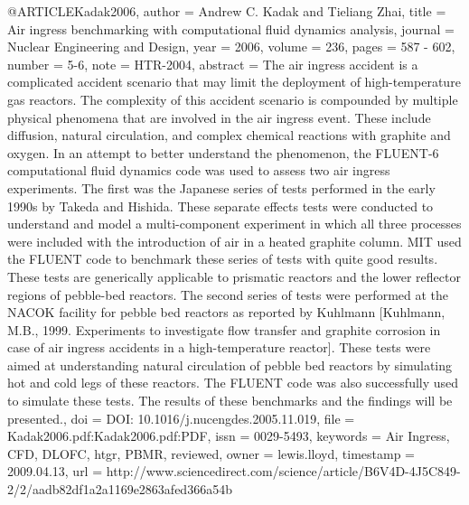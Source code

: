 {@ARTICLE{Kadak2006,
  author = {Andrew C. Kadak and Tieliang Zhai},
  title = {Air ingress benchmarking with computational fluid dynamics analysis},
  journal = {Nuclear Engineering and Design},
  year = {2006},
  volume = {236},
  pages = {587 - 602},
  number = {5-6},
  note = {HTR-2004},
  abstract = {The air ingress accident is a complicated accident scenario that may
	limit the deployment of high-temperature gas reactors. The complexity
	of this accident scenario is compounded by multiple physical phenomena
	that are involved in the air ingress event. These include diffusion,
	natural circulation, and complex chemical reactions with graphite
	and oxygen. In an attempt to better understand the phenomenon, the
	FLUENT-6 computational fluid dynamics code was used to assess two
	air ingress experiments. The first was the Japanese series of tests
	performed in the early 1990s by Takeda and Hishida. These separate
	effects tests were conducted to understand and model a multi-component
	experiment in which all three processes were included with the introduction
	of air in a heated graphite column. MIT used the FLUENT code to benchmark
	these series of tests with quite good results. These tests are generically
	applicable to prismatic reactors and the lower reflector regions
	of pebble-bed reactors. The second series of tests were performed
	at the NACOK facility for pebble bed reactors as reported by Kuhlmann
	[Kuhlmann, M.B., 1999. Experiments to investigate flow transfer and
	graphite corrosion in case of air ingress accidents in a high-temperature
	reactor]. These tests were aimed at understanding natural circulation
	of pebble bed reactors by simulating hot and cold legs of these reactors.
	The FLUENT code was also successfully used to simulate these tests.
	The results of these benchmarks and the findings will be presented.},
  doi = {DOI: 10.1016/j.nucengdes.2005.11.019},
  file = {Kadak2006.pdf:Kadak2006.pdf:PDF},
  issn = {0029-5493},
  keywords = {Air Ingress, CFD, DLOFC, htgr, PBMR, reviewed},
  owner = {lewis.lloyd},
  timestamp = {2009.04.13},
  url = {http://www.sciencedirect.com/science/article/B6V4D-4J5C849-2/2/aadb82df1a2a1169e2863afed366a54b}
}

}
